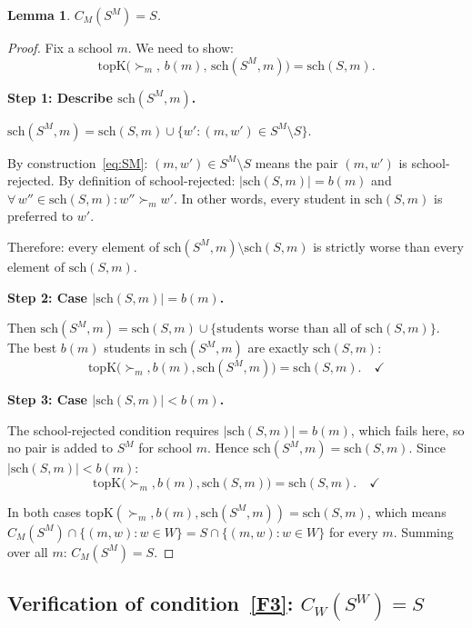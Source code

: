 \documentclass[12pt, a4paper]{article}
\theoremstyle{definition}
\theoremstyle{plain}
\newtheorem{lemma}[definition]{Lemma}
\theoremstyle{remark}
\newcommand{\CM}{C_M}
\newcommand{\CW}{C_W}
\newcommand{\SM}{S^M}
\newcommand{\SW}{S^W}
\newcommand{\school}[2]{\mathrm{sch}(#1,#2)}
\newcommand{\topK}{\mathrm{topK}}
\newcommand{\quota}{b}
\begin{document}
\begin{lemma}
\label{lem:choiceM}
$\CM(\SM) = S$.
\end{lemma}
\begin{proof}
Fix a school $m$. We need to show:
\[
  \topK\bigl(\succ_m,\,\quota(m),\,\school{\SM}{m}\bigr) = \school{S}{m}.
\]

\textbf{Step 1: Describe $\school{\SM}{m}$.}

$\school{\SM}{m} = \school{S}{m} \cup \{w' : (m, w') \in \SM \setminus S\}$.

By construction~\eqref{eq:SM}: $(m, w') \in \SM \setminus S$ means the pair
$(m, w')$ is school-rejected. By definition of school-rejected:
$|\school{S}{m}| = \quota(m)$ and $\forall\, w'' \in \school{S}{m} : w'' \succ_m w'$.
In other words, every student in $\school{S}{m}$ is preferred to $w'$.

Therefore: every element of $\school{\SM}{m} \setminus \school{S}{m}$ is
strictly worse than every element of $\school{S}{m}$.

\textbf{Step 2: Case $|\school{S}{m}| = \quota(m)$.}

Then $\school{\SM}{m} = \school{S}{m} \cup \{\text{students worse than all
of } \school{S}{m}\}$. The best $\quota(m)$ students in $\school{\SM}{m}$
are exactly $\school{S}{m}$:
\[
  \topK\bigl(\succ_m, \quota(m), \school{\SM}{m}\bigr) = \school{S}{m}.
  \quad\checkmark
\]

\textbf{Step 3: Case $|\school{S}{m}| < \quota(m)$.}

The school-rejected condition requires $|\school{S}{m}| = \quota(m)$, which
fails here, so no pair is added to $\SM$ for school $m$.
Hence $\school{\SM}{m} = \school{S}{m}$. Since $|\school{S}{m}| < \quota(m)$:
\[
  \topK\bigl(\succ_m, \quota(m), \school{S}{m}\bigr) = \school{S}{m}.
  \quad\checkmark
\]

In both cases $\topK(\succ_m, \quota(m), \school{\SM}{m}) = \school{S}{m}$,
which means
$\CM(\SM) \cap \{(m, w) : w \in W\} = S \cap \{(m, w) : w \in W\}$
for every $m$. Summing over all $m$: $\CM(\SM) = S$.
\end{proof}

\subsection{Verification of condition~\eqref{F3}: $\CW(\SW) = S$}
\end{document}
